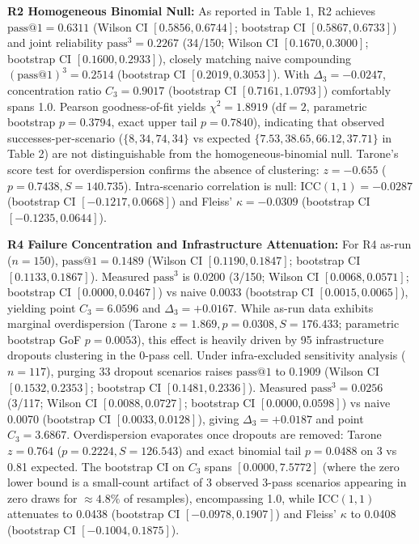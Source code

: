 \documentclass[11pt,letterpaper]{article}
\begin{document}
\textbf{R2 Homogeneous Binomial Null:} As reported in Table 1, R2 achieves $\text{pass@1} = 0.6311$ (Wilson CI $[0.5856, 0.6744]$; bootstrap CI $[0.5867, 0.6733]$) and joint reliability $\text{pass}^3 = 0.2267$ (34/150; Wilson CI $[0.1670, 0.3000]$; bootstrap CI $[0.1600, 0.2933]$), closely matching naive compounding $(\text{pass@1})^3 = 0.2514$ (bootstrap CI $[0.2019, 0.3053]$). With $\Delta_3 = -0.0247$, concentration ratio $C_3 = 0.9017$ (bootstrap CI $[0.7161, 1.0793]$) comfortably spans 1.0. Pearson goodness-of-fit yields $\chi^2 = 1.8919$ ($\text{df}=2$, parametric bootstrap $p = 0.3794$, exact upper tail $p = 0.7840$), indicating that observed successes-per-scenario ($\{8, 34, 74, 34\}$ vs expected $\{7.53, 38.65, 66.12, 37.71\}$ in Table 2) are not distinguishable from the homogeneous-binomial null. Tarone's score test for overdispersion confirms the absence of clustering: $z = -0.655$ ($p = 0.7438, S = 140.735$). Intra-scenario correlation is null: $\text{ICC}(1,1) = -0.0287$ (bootstrap CI $[-0.1217, 0.0668]$) and Fleiss' $\kappa = -0.0309$ (bootstrap CI $[-0.1235, 0.0644]$).

\textbf{R4 Failure Concentration and Infrastructure Attenuation:} For R4 as-run ($n=150$), $\text{pass@1} = 0.1489$ (Wilson CI $[0.1190, 0.1847]$; bootstrap CI $[0.1133, 0.1867]$). Measured $\text{pass}^3$ is 0.0200 (3/150; Wilson CI $[0.0068, 0.0571]$; bootstrap CI $[0.0000, 0.0467]$) vs naive 0.0033 (bootstrap CI $[0.0015, 0.0065]$), yielding point $C_3 = 6.0596$ and $\Delta_3 = +0.0167$. While as-run data exhibits marginal overdispersion (Tarone $z = 1.869, p = 0.0308, S = 176.433$; parametric bootstrap GoF $p = 0.0053$), this effect is heavily driven by 95 infrastructure dropouts clustering in the 0-pass cell. Under infra-excluded sensitivity analysis ($n=117$), purging 33 dropout scenarios raises $\text{pass@1}$ to 0.1909 (Wilson CI $[0.1532, 0.2353]$; bootstrap CI $[0.1481, 0.2336]$). Measured $\text{pass}^3 = 0.0256$ (3/117; Wilson CI $[0.0088, 0.0727]$; bootstrap CI $[0.0000, 0.0598]$) vs naive 0.0070 (bootstrap CI $[0.0033, 0.0128]$), giving $\Delta_3 = +0.0187$ and point $C_3 = 3.6867$. Overdispersion evaporates once dropouts are removed: Tarone $z = 0.764$ ($p = 0.2224, S = 126.543$) and exact binomial tail $p = 0.0488$ on 3 vs 0.81 expected. The bootstrap CI on $C_3$ spans $[0.0000, 7.5772]$ (where the zero lower bound is a small-count artifact of 3 observed 3-pass scenarios appearing in zero draws for $\approx 4.8\%$ of resamples), encompassing 1.0, while $\text{ICC}(1,1)$ attenuates to 0.0438 (bootstrap CI $[-0.0978, 0.1907]$) and Fleiss' $\kappa$ to 0.0408 (bootstrap CI $[-0.1004, 0.1875]$).
\end{document}
